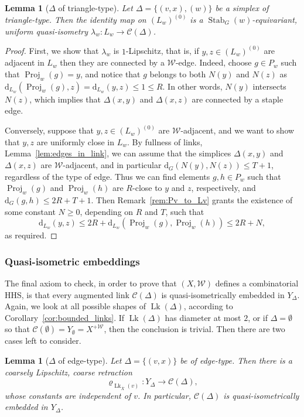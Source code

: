 \documentclass[svgnames]{amsart}
\theoremstyle{plain}
\newtheorem{lemma}[thm]{Lemma}
\theoremstyle{definition}
\newcommand{\C}{\mathcal C}
\newcommand{\ov}[1]{\overline{#1}}
\newcommand{\dist}{\mathrm{d}}
\newcommand{\link}{\operatorname{Lk}}
\newcommand{\Stab}[2]{\operatorname{Stab}_{#1}(#2)}
\newcommand{\Proj}{\operatorname{Proj}}
\newcommand{\W}{\mathcal{W}}
\begin{document}
\begin{lemma}[$\Delta$ of triangle-type]\label{lem:hyp_link_triangle_type} Let $\Delta=\{(v,x),(w)\}$ be a simplex of triangle-type. Then the identity map on $(L_w)^{(0)}$ is a $\Stab{G}{w}$-equivariant, uniform quasi-isometry $\lambda_w\colon L_w \to \C(\Delta)$.
\end{lemma}


\begin{proof}
First, we show that $\lambda_w$ is $1$-Lipschitz, that is, if $y,z\in (L_w)^{(0)}$ are adjacent in $L_w$ then they are connected by a $\W$-edge. Indeed, choose $g\in P_w$ such that $\Proj_w(g)=y$, and notice that $g$ belongs to both $N(y)$ and $N(z)$ as $\dist_{L_w}(\Proj_w(g), z)=\dist_{L_w}(y,z)\le 1\le R$. In other words, $N(y)$ intersects $N(z)$, which implies that $\Delta(x,y)$ and $\Delta(x,z)$ are connected by a staple edge.

Conversely, suppose that $y,z\in (L_w)^{(0)}$ are $\W$-adjacent, and we want to show that $y,z$ are uniformly close in $L_w$. By fullness of links, Lemma~\ref{lem:edges_in_link}, we can assume that the simplices $\Delta(x,y)$ and $\Delta(x,z)$ are $\W$-adjacent, and in particular $\dist_G(N(y),N(z))\le T+1$, regardless of the type of edge. Thus we can find elements  $g, h \in P_w$ such that $\Proj_w(g)$ and $\Proj_w(h)$ are $R$-close to $y$ and $z$, respectively, and $\dist_G(g,h)\le 2R+T+1$. Then Remark~\ref{rem:Pv_to_Lv} grants the existence of some constant $N\ge 0$, depending on $R$ and $T$, such that 
$$\dist_{L_w}(y,z)\le 2R+ \dist_{L_w}(\Proj_w(g),\Proj_w(h))\le 2R+N,$$
as required.
\end{proof}



\subsubsection{Quasi-isometric embeddings}\label{subsec:link_qi_emb}
The final axiom to check, in order to prove that $(X,\W)$ defines a combinatorial HHS, is that every augmented link $\C(\Delta)$ is quasi-isometrically embedded in $Y_\Delta$. Again, we look at all possible shapes of $\link(\Delta)$, according to Corollary~\ref{cor:bounded_links}. If $\link(\Delta)$ has diameter at most $2$, or if $\Delta=\emptyset$ so that $\C(\emptyset)=Y_\emptyset=X^{+\W}$, then the conclusion is trivial. Then there are two cases left to consider.




\begin{lemma}[$\Delta$ of edge-type]\label{lem:qi_embedding_edge_case}
    Let $\Delta=\{(v,x)\}$ be of edge-type. Then there is a coarsely Lipschitz, coarse retraction
    $$\varrho_{\link_{\ov X}(v)}\colon Y_\Delta\to \C(\Delta),$$
    whose constants are independent of $v$. In particular, $\C(\Delta)$ is quasi-isometrically embedded in $Y_\Delta$.
\end{lemma}
\end{document}
